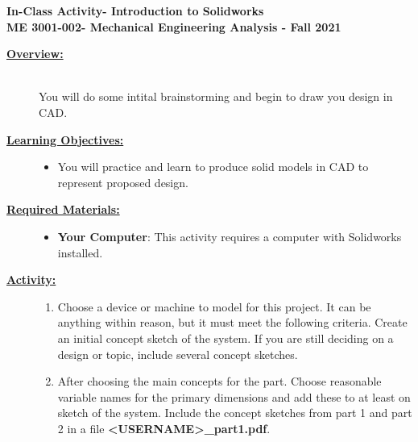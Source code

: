 \documentclass[12pt]{article}
\newcommand{\COURNAME}{ME 3001-002}
\newcommand{\CURRTERM}{Fall 2021} %
\newcommand{\ANUM}{2} %
\newcommand{\activitytitle}{Introduction to Solidworks} %
\begin{document}
\thispagestyle{plain}

\begin{center}
   {\bf \Large In-Class Activity\hspc\ANUM\hspc - \activitytitle}\vspace{3mm}\\
   {\bf \large \COURNAME - Mechanical Engineering Analysis - \CURRTERM} \vspace{5mm}\\
\end{center}

\begin{description}

\item[\textbf{\underline{Overview:}}] \hfill \vspace{3mm}\\
You will do some intital brainstorming and begin to draw you design in CAD.

\item[\textbf{\underline{Learning Objectives:}}] \hfill \vspace{0mm}

\begin{itemize}
	\item You will practice and learn to produce solid models in CAD to represent proposed design. 
\end{itemize}

\item[\textbf{\underline{Required Materials:}}] \hfill \vspace{0mm}

\begin{itemize}
	\item {\bf Your Computer}: This activity requires a computer with Solidworks installed.
\end{itemize}

\item[\textbf{\underline{Activity:}}] \hfill \vspace{0mm}

\begin{enumerate}
	

	\item Choose a device or machine to model for this project. It can be anything within reason, but it must meet the following criteria. Create an initial concept sketch of the system. If you are still deciding on a design or topic, include several concept sketches. 
	
	\item After choosing the main concepts for the part. Choose reasonable variable names for the primary dimensions and add these to at least on sketch of the system. Include the concept sketches from part 1 and part 2 in a file {\bf \BL<USERNAME>\BK\_part1.pdf}. 
	

\end{enumerate}
\end{description}
\end{document}
